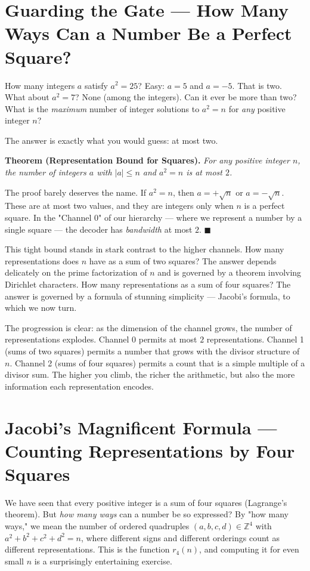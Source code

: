 \documentclass[11pt,twoside,openright]{book}
\theoremstyle{definition}
\theoremstyle{remark}
\begin{document}
\section{Guarding the Gate --- How Many Ways Can a Number Be a Perfect Square?}

How many integers $a$ satisfy $a^2 = 25$? Easy: $a = 5$ and $a = -5$. That is two. What about $a^2 = 7$? None (among the integers). Can it ever be more than two? What is the \textit{maximum} number of integer solutions to $a^2 = n$ for \textit{any} positive integer $n$?

The answer is exactly what you would guess: at most two.

\textbf{Theorem (Representation Bound for Squares).} \textit{For any positive integer $n$, the number of integers $a$ with $|a| \leq n$ and $a^2 = n$ is at most $2$.}

The proof barely deserves the name. If $a^2 = n$, then $a = +\sqrt{n}$ or $a = -\sqrt{n}$. These are at most two values, and they are integers only when $n$ is a perfect square. In the "Channel 0" of our hierarchy --- where we represent a number by a single square --- the decoder has \textit{bandwidth} at most $2$. $\blacksquare$


This tight bound stands in stark contrast to the higher channels. How many representations does $n$ have as a sum of two squares? The answer depends delicately on the prime factorization of $n$ and is governed by a theorem involving Dirichlet characters. How many representations as a sum of four squares? The answer is governed by a formula of stunning simplicity --- Jacobi's formula, to which we now turn.

The progression is clear: as the dimension of the channel grows, the number of representations explodes. Channel 0 permits at most $2$ representations. Channel 1 (sums of two squares) permits a number that grows with the divisor structure of $n$. Channel 2 (sums of four squares) permits a count that is a simple multiple of a divisor sum. The higher you climb, the richer the arithmetic, but also the more information each representation encodes.


\section{Jacobi's Magnificent Formula --- Counting Representations by Four Squares}

We have seen that every positive integer is a sum of four squares (Lagrange's theorem). But \textit{how many ways} can a number be so expressed? By "how many ways," we mean the number of ordered quadruples $(a, b, c, d) \in \mathbb{Z}^4$ with $a^2 + b^2 + c^2 + d^2 = n$, where different signs and different orderings count as different representations. This is the function $r_4(n)$, and computing it for even small $n$ is a surprisingly entertaining exercise.
\end{document}
